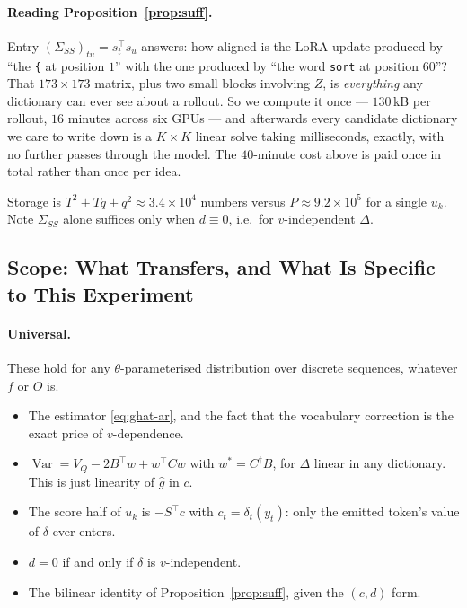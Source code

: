 \documentclass{article}
\theoremstyle{plain}
\theoremstyle{definition}
\DeclareMathOperator{\Var}{Var}
\begin{document}
\paragraph{Reading Proposition~\ref{prop:suff}.} Entry $(\Sigma_{SS})_{tu}=s_t^\top s_u$ answers: how
aligned is the LoRA update produced by ``the \texttt{\{} at position $1$'' with the one produced by
``the word \texttt{sort} at position $60$''? That $173\times173$ matrix, plus two small blocks
involving $Z$, is \emph{everything} any dictionary can ever see about a rollout. So we compute it once
--- $130$\,kB per rollout, $16$ minutes across six GPUs --- and afterwards every candidate dictionary
we care to write down is a $K\times K$ linear solve taking milliseconds, exactly, with no further
passes through the model. The $40$-minute cost above is paid once in total rather than once per idea.

Storage is $T^2+Tq+q^2\approx3.4\times10^4$ numbers versus $P\approx9.2\times10^5$ for a single $u_k$.
Note $\Sigma_{SS}$ alone suffices only when $d\equiv0$, i.e.\ for $v$-independent $\Delta$.

\subsection{Scope: What Transfers, and What Is Specific to This Experiment}
\label{sec:scope}

\paragraph{Universal.} These hold for any $\theta$-parameterised distribution over discrete sequences,
whatever $f$ or $O$ is.
\begin{itemize}
\item The estimator \eqref{eq:ghat-ar}, and the fact that the vocabulary correction is the exact price
of $v$-dependence.
\item $\Var=V_Q-2B^\top w+w^\top Cw$ with $w^*=C^\dagger B$, for $\Delta$ linear in any dictionary.
This is just linearity of $\hat g$ in $c$.
\item The score half of $u_k$ is $-S^\top c$ with $c_t=\delta_t(y_t)$: only the emitted token's value
of $\delta$ ever enters.
\item $d=0$ if and only if $\delta$ is $v$-independent.
\item The bilinear identity of Proposition~\ref{prop:suff}, given the $(c,d)$ form.
\end{itemize}
\end{document}
